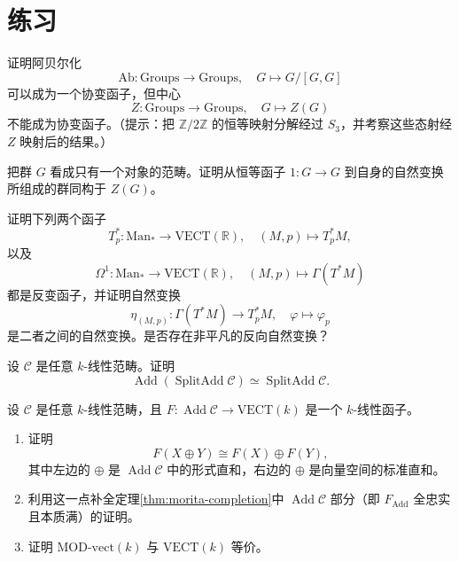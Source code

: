 \section{练习}\label{sec:categories-exercises}
\begin{exercise}\label{exer:categories-abelianization}
证明阿贝尔化
\[
  \mathrm{Ab}\colon\mathrm{Groups}\to\mathrm{Groups},\quad
  G\longmapsto G/[G,G]
\]
可以成为一个协变函子，但中心
\[
  Z\colon\mathrm{Groups}\to\mathrm{Groups},\quad
  G\longmapsto Z(G)
\]
不能成为协变函子。（提示：把 $\mathbb Z/2\mathbb Z$ 的恒等映射分解经过 $S_3$，并考察这些态射经 $Z$ 映射后的结果。）
\end{exercise}

\begin{exercise}\label{exer:categories-center}
把群 $G$ 看成只有一个对象的范畴。证明从恒等函子 $1\colon G\to G$ 到自身的自然变换所组成的群同构于 $Z(G)$。
\end{exercise}

\begin{exercise}\label{exer:categories-cotangent}
证明下列两个函子
\[
  T^*_p\colon\mathrm{Man}_*\to\mathrm{VECT}(\mathbb R),\quad
  (M,p)\longmapsto T_p^*M,
\]
以及
\[
  \Omega^1\colon\mathrm{Man}_*\to\mathrm{VECT}(\mathbb R),\quad
  (M,p)\longmapsto\Gamma(T^*M)
\]
都是反变函子，并证明自然变换
\[
  \eta_{(M,p)}\colon\Gamma(T^*M)\to T_p^*M,\quad
  \varphi\longmapsto\varphi_p
\]
是二者之间的自然变换。是否存在非平凡的反向自然变换？
\end{exercise}

\begin{exercise}\label{exer:categories-additive-idempotent}
设 $\mathcal C$ 是任意 $k$-线性范畴。证明
\[
  \operatorname{Add}(\operatorname{SplitAdd}\mathcal C)
  \simeq\operatorname{SplitAdd}\mathcal C.
\]
\end{exercise}

\begin{exercise}\label{exer:categories-functor-additive}
设 $\mathcal C$ 是任意 $k$-线性范畴，且 $F\colon\operatorname{Add}\mathcal C\to\mathrm{VECT}(k)$ 是一个 $k$-线性函子。
\begin{enumerate}
  \item 证明
  \[
    F(X\oplus Y)\cong F(X)\oplus F(Y),
  \]
  其中左边的 $\oplus$ 是 $\operatorname{Add}\mathcal C$ 中的形式直和，右边的 $\oplus$ 是向量空间的标准直和。
  \item 利用这一点补全定理\ref{thm:morita-completion}中 $\operatorname{Add}\mathcal C$ 部分（即 $F_{\mathrm{Add}}$ 全忠实且本质满）的证明。
  \item 证明 $\mathrm{MOD}\text{-}\mathrm{vect}(k)$ 与 $\mathrm{VECT}(k)$ 等价。
\end{enumerate}
\end{exercise}

